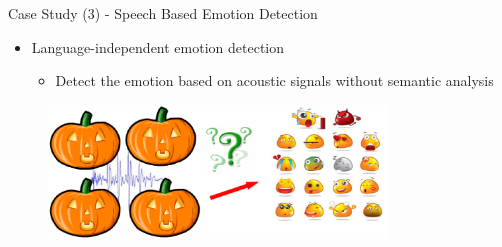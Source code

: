 \documentclass[
 size=14pt,
 paper=smartboard,  %
 mode=present, 		%
 display=slides, 	%
 style=tuliplab,  	%
 pauseslide,
 fleqn,leqno]{powerdot}{}
\begin{document}
\begin{slide}[toc=,bm=]{Case Study (3) - Speech Based Emotion Detection}

\begin{itemize}
  \item Language-independent emotion detection

  \begin{itemize}
    \item Detect the emotion based on acoustic signals without semantic analysis

  \end{itemize}
\end{itemize}
\begin{figure}
  \includegraphics[width=0.8\textwidth]{figures//theme1//Theme1_22.eps}
\end{figure}
%

\end{slide}
\end{document}
